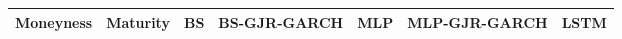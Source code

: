 \begin{tabular}{lllllll}
\toprule
Moneyness & Maturity & BS & BS-GJR-GARCH & MLP & MLP-GJR-GARCH & LSTM \\
\midrule
\bottomrule
\end{tabular}
